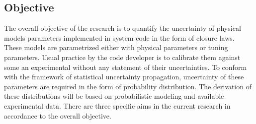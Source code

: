 \documentclass[11pt,titlepage]{article}
\begin{document}




\subsection{Objective}

The overall objective of the research is to quantify the uncertainty of physical models parameters implemented in system code in the form of closure laws.
These models are parametrized either with physical parameters or tuning parameters. 
Usual practice by the code developer is to calibrate them against some an experimental without any statement of their uncertainties. 
To conform with the framework of statistical uncertainty propagation, uncertainty of these parameters are required in the form of probability distribution.
The derivation of these distributions will be based on probabilistic modeling and available experimental data.
There are three specific aims in the current research in accordance to the overall objective. 
\end{document}
